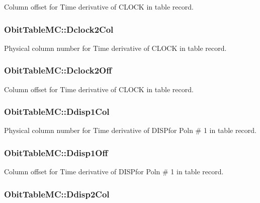 Column offset for Time derivative of CLOCK in table record. 

\subsubsection{ {\bf Obit\-Table\-MC::Dclock2Col}}\label{structObitTableMC_o63}


Physical column number for Time derivative of CLOCK in table record. 

\subsubsection{ {\bf Obit\-Table\-MC::Dclock2Off}}\label{structObitTableMC_o62}


Column offset for Time derivative of CLOCK in table record. 

\subsubsection{ {\bf Obit\-Table\-MC::Ddisp1Col}}\label{structObitTableMC_o59}


Physical column number for Time derivative of DISPfor Poln \# 1 in table record. 

\subsubsection{ {\bf Obit\-Table\-MC::Ddisp1Off}}\label{structObitTableMC_o58}


Column offset for Time derivative of DISPfor Poln \# 1 in table record. 

\subsubsection{ {\bf Obit\-Table\-MC::Ddisp2Col}}\label{structObitTableMC_o71}


